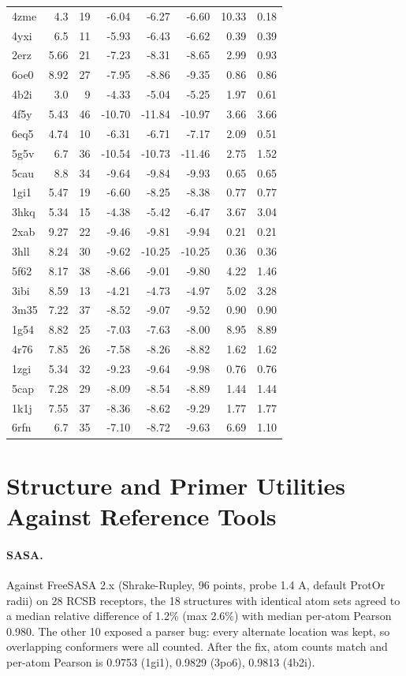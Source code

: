 {\begin{longtable}{lrrrrrrr}
4zme & 4.3 & 19 & -6.04 & -6.27 & -6.60 & 10.33 & 0.18\\
4yxi & 6.5 & 11 & -5.93 & -6.43 & -6.62 & 0.39 & 0.39\\
2erz & 5.66 & 21 & -7.23 & -8.31 & -8.65 & 2.99 & 0.93\\
6oe0 & 8.92 & 27 & -7.95 & -8.86 & -9.35 & 0.86 & 0.86\\
4b2i & 3.0 & 9 & -4.33 & -5.04 & -5.25 & 1.97 & 0.61\\
4f5y & 5.43 & 46 & -10.70 & -11.84 & -10.97 & 3.66 & 3.66\\
6eq5 & 4.74 & 10 & -6.31 & -6.71 & -7.17 & 2.09 & 0.51\\
5g5v & 6.7 & 36 & -10.54 & -10.73 & -11.46 & 2.75 & 1.52\\
5cau & 8.8 & 34 & -9.64 & -9.84 & -9.93 & 0.65 & 0.65\\
1gi1 & 5.47 & 19 & -6.60 & -8.25 & -8.38 & 0.77 & 0.77\\
3hkq & 5.34 & 15 & -4.38 & -5.42 & -6.47 & 3.67 & 3.04\\
2xab & 9.27 & 22 & -9.46 & -9.81 & -9.94 & 0.21 & 0.21\\
3hll & 8.24 & 30 & -9.62 & -10.25 & -10.25 & 0.36 & 0.36\\
5f62 & 8.17 & 38 & -8.66 & -9.01 & -9.80 & 4.22 & 1.46\\
3ibi & 8.59 & 13 & -4.21 & -4.73 & -4.97 & 5.02 & 3.28\\
3m35 & 7.22 & 37 & -8.52 & -9.07 & -9.52 & 0.90 & 0.90\\
1g54 & 8.82 & 25 & -7.03 & -7.63 & -8.00 & 8.95 & 8.89\\
4r76 & 7.85 & 26 & -7.58 & -8.26 & -8.82 & 1.62 & 1.62\\
1zgi & 5.34 & 32 & -9.23 & -9.64 & -9.98 & 0.76 & 0.76\\
5cap & 7.28 & 29 & -8.09 & -8.54 & -8.89 & 1.44 & 1.44\\
1k1j & 7.55 & 37 & -8.36 & -8.62 & -9.29 & 1.77 & 1.77\\
6rfn & 6.7 & 35 & -7.10 & -8.72 & -9.63 & 6.69 & 1.10\\
\hline\end{longtable}}
\section{Structure and Primer Utilities Against Reference Tools}
\paragraph{SASA.} Against FreeSASA 2.x (Shrake-Rupley, 96 points, probe 1.4 A, default ProtOr radii) on 28 RCSB receptors, the 18 structures with identical atom sets agreed to a median relative difference of 1.2\% (max 2.6\%) with median per-atom Pearson 0.980. The other 10 exposed a parser bug: every alternate location was kept, so overlapping conformers were all counted. After the fix, atom counts match and per-atom Pearson is 0.9753 (1gi1), 0.9829 (3po6), 0.9813 (4b2i).
